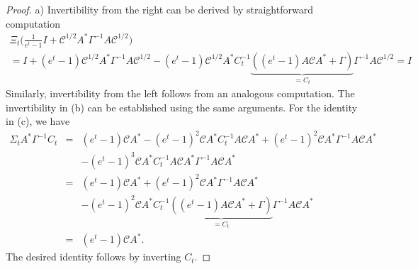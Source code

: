 \documentclass[10pt,a4paper]{amsart}
\newcommand{\C}{\mathcal C}
\begin{document}
\begin{proof}
a) Invertibility from the right can be derived by straightforward computation
    \begin{multline*}
         \Xi_t \bigg( \frac{1}{e^t-1}I + \C^{1/2}A^* \Gamma^{-1}A \C^{1/2}\bigg) \\
         = I + (e^t-1) \C^{1/2}A^* \Gamma^{-1}A \C^{1/2} 
         -  (e^t-1)\C^{1/2} A^* C_t^{-1} \underbrace{\left((e^t-1) A\C A^* + \Gamma \right)}_{= C_t} \Gamma^{-1}A\C^{1/2} = I
    \end{multline*}
Similarly, invertibility from the left follows from an analogous computation. The invertibility in (b) can be established using the same arguments.
For the identity in (c), we have
    \begin{eqnarray*}
        \Sigma_t A^* \Gamma^{-1} C_t 
        & = & (e^t-1)\C A^* -(e^t-1)^2 \C A^*C_t^{-1} A \C A^* + (e^t-1)^2 \C A^* \Gamma^{-1} A \C A^* \\
        & & - (e^t-1)^3 \C A^* C_t^{-1} A \C A^* \Gamma^{-1} A \C A^* \\
        & = & (e^t-1) \C A^* + (e^t-1)^2 \C A^* \Gamma^{-1} A \C A^* \\
        & & - (e^t-1)^2 \C A^* C_t^{-1} \underbrace{\left((e^t-1)A \C A^* + \Gamma \right)}_{=C_t} \Gamma^{-1} A \C A^* \\
        & =& (e^t-1) \C A^*.
    \end{eqnarray*}
The desired identity follows by inverting $C_t$.
\end{proof}
\end{document}

